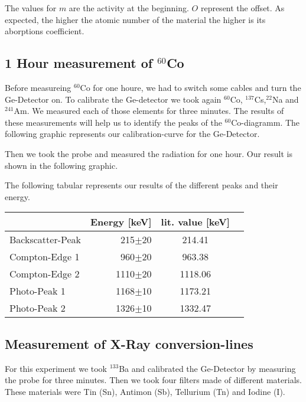 The values for $m$ are the activity at the beginning. $O$ represent the offset. As expected, the higher the atomic number of the material the higher is its aborptions coefficient.

\newpage
\subsection{1 Hour measurement of $^{60}$Co}
Before measureing $^{60}$Co for one houre, we had to switch some cables and turn the Ge-Detector on. To calibrate the Ge-detector we took again $^{60}$Co, $^{137}$Cs,$^{22}$Na and $^{241}$Am. We measured each of those elements for three minutes. The results of these measurements will help us to identify the peaks of the $^{60}$Co-diagramm. The following graphic represents our calibration-curve for the Ge-Detector.



Then we took the probe and measured the radiation for one hour. Our result is shown in the following graphic.


The following tabular represents our results of the different peaks and their energy.
\\

\begin{center}
\begin{tabular}{l|r|c|l}
& Energy [keV] & lit. value [keV] & \\
\hline
Backscatter-Peak & 215$\pm$20& 214.41	\\
Compton-Edge 1 & 960$\pm$20 & 963.38 	\\
Compton-Edge 2 & 1110$\pm$20 & 1118.06 	\\
Photo-Peak 1 & 1168$\pm$10 & 1173.21 	\\
Photo-Peak 2 & 1326$\pm$10 & 1332.47 	\\
\end{tabular}
\end{center}


\subsection{Measurement of X-Ray conversion-lines}
For this experiment we took $^{133}$Ba and calibrated the Ge-Detector by measuring the probe for three minutes. Then we took four filters made of different materials. These materials were Tin (Sn), Antimon (Sb),  Tellurium (Tn) and Iodine (I).

